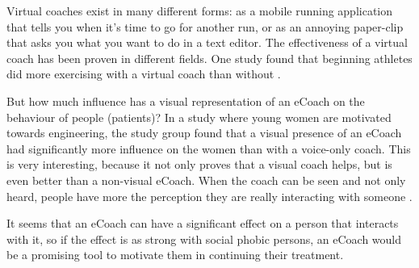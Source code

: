 \documentclass[twoside]{article}
\begin{document}
\begin{multicols}{2}
Virtual coaches exist in many different forms: as a mobile running application that tells you when it's time to go for another run, or as an annoying paper-clip that asks you what you want to do in a text editor.  The effectiveness of a virtual coach has been proven in different fields. One study found that beginning athletes did more exercising with a virtual coach than without \cite{eyck2006effect}. 

But how much influence has a visual representation of an eCoach on the behaviour of people (patients)? In a study \cite{rosenberg2007importance} where young women are motivated towards engineering, the study group found that a visual presence of an eCoach had significantly more influence on the women than with a voice-only coach. This is very interesting, because it not only proves that a visual coach helps, but is even better than a non-visual eCoach. When the coach can be seen and not only heard, people have more the perception they are really interacting with someone \cite{baylor2009promoting}. 

It seems that an eCoach can have a significant effect on a person that interacts with it, so if the effect is as strong with social phobic persons, an eCoach would be a promising tool to motivate them in continuing their treatment.




\end{multicols}
\end{document}
